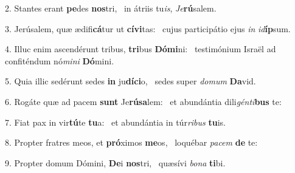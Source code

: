2. Stantes erant \textbf{pe}des \textbf{nos}tri, \ast\  in átriis tu\textit{is}, \textit{Je}\textbf{rú}salem.\

3. Jerúsalem, quæ ædifi\textbf{cá}tur ut \textbf{cí}\textbf{vi}tas: \ast\  cujus participátio ejus \textit{in} \textit{id}\textbf{íp}sum.\

4. Illuc enim ascendérunt tribus, \textbf{tri}bus \textbf{Dó}\textbf{mi}ni: \ast\  testimónium Israël ad confiténdum nó\textit{mi}\textit{ni} \textbf{Dó}mini.\

5. Quia illic sedérunt sedes \textbf{in} ju\textbf{dí}\textbf{ci}o, \ast\  sedes super \textit{do}\textit{mum} \textbf{Da}vid.\

6. Rogáte quæ ad pacem \textbf{sunt} Je\textbf{rú}\textbf{sa}lem: \ast\  et abundántia dili\textit{gén}\textit{ti}\textbf{bus} te:\

7. Fiat pax in vir\textbf{tú}te \textbf{tu}a: \ast\  et abundántia in túr\textit{ri}\textit{bus} \textbf{tu}is.\

8. Propter fratres meos, et \textbf{pró}ximos \textbf{me}os, \ast\  loquébar \textit{pa}\textit{cem} \textbf{de} te:\

9. Propter domum Dómini, \textbf{De}i \textbf{nos}tri, \ast\  quæsívi \textit{bo}\textit{na} \textbf{ti}bi.\

